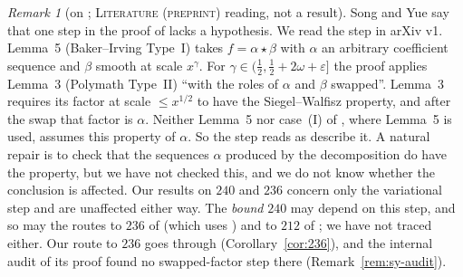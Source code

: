 \documentclass[11pt]{amsart}
\theoremstyle{definition}
\theoremstyle{remark}
\newtheorem{remark}[theorem]{Remark}
\newcommand{\lbl}[1]{\textup{\textsc{#1}}}
\begin{document}
\begin{remark}[on {\cite[Lemma~5]{Sta26}}; \lbl{Literature (preprint)} reading, not a result]\label{rem:sta-lemma5}
Song and Yue \cite[Remark~4.23]{SY26} say that one step in the proof of
\cite[Lemma~5]{Sta26} lacks a hypothesis. We read the step in arXiv v1. Lemma~5
(Baker--Irving Type~I) takes $f=\alpha\star\beta$ with $\alpha$ an arbitrary
coefficient sequence and $\beta$ smooth at scale $x^\gamma$. For
$\gamma\in(\frac12,\frac12+2\omega+\varepsilon]$ the proof applies Lemma~3
(Polymath Type~II) ``with the roles of $\alpha$ and $\beta$ swapped''. Lemma~3
requires its factor at scale $\le x^{1/2}$ to have the Siegel--Walfisz
property, and after the swap that factor is $\alpha$. Neither Lemma~5 nor
case~(I) of \cite[Definition~9]{Sta26}, where Lemma~5 is used, assumes this
property of $\alpha$. So the step reads as \cite{SY26} describe it. A
natural repair is to check that the sequences $\alpha$ produced by the
decomposition do have the property, but we have not checked this, and we do
not know whether the conclusion is affected. Our results on $240$ and $236$
concern only the variational step and are unaffected either way. The
\emph{bound} $240$ may depend on this step, and so may the routes to $236$ of
\cite{Kin26} (which uses \cite[Prop.~3]{Sta26}) and to $212$ of \cite{Cha26};
we have not traced either. Our route to $236$ goes through
\cite[Theorem~4.18]{SY26} (Corollary~\ref{cor:236}), and the internal audit
of its proof found no swapped-factor step there (Remark~\ref{rem:sy-audit}).
\end{remark}
\end{document}
